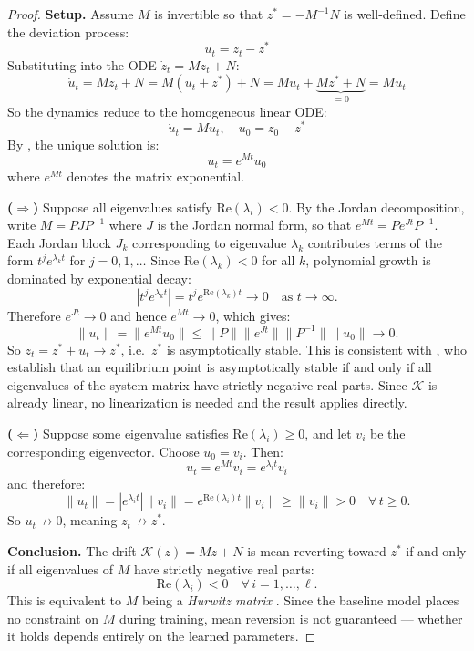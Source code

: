 \begin{proof}
\textbf{Setup.} Assume $M$ is invertible so that $z^* = -M^{-1}N$ is 
well-defined. Define the deviation process:
\[
u_t = z_t - z^*
\]
Substituting into the ODE $\dot{z}_t = Mz_t + N$:
\[
\dot{u}_t = Mz_t + N = M(u_t + z^*) + N = Mu_t + 
\underbrace{Mz^* + N}_{=0} = Mu_t
\]
So the dynamics reduce to the homogeneous linear ODE:
\[
\dot{u}_t = Mu_t, \quad u_0 = z_0 - z^*
\]
By \citet[][p.~129]{Hirsch2012}, the unique solution is:
\[
u_t = e^{Mt}u_0
\]
where $e^{Mt}$ denotes the matrix exponential.

\textbf{($\Rightarrow$)} Suppose all eigenvalues satisfy 
$\mathrm{Re}(\lambda_i) < 0$. By the Jordan decomposition, write 
$M = PJP^{-1}$ where $J$ is the Jordan normal form, so that 
$e^{Mt} = Pe^{Jt}P^{-1}$. Each Jordan block $J_k$ corresponding to 
eigenvalue $\lambda_k$ contributes terms of the form $t^j e^{\lambda_k t}$ 
for $j = 0, 1, \ldots$ Since $\mathrm{Re}(\lambda_k) < 0$ for all $k$, 
polynomial growth is dominated by exponential decay:
\[
|t^j e^{\lambda_k t}| = t^j e^{\mathrm{Re}(\lambda_k)t} \to 0 
\quad \text{as } t \to \infty.
\]
Therefore $e^{Jt} \to 0$ and hence $e^{Mt} \to 0$, which gives:
\[
\|u_t\| = \|e^{Mt}u_0\| \leq \|P\|\|e^{Jt}\|\|P^{-1}\|\|u_0\| \to 0.
\]
So $z_t = z^* + u_t \to z^*$, i.e.\ $z^*$ is asymptotically stable. This 
is consistent with \citet[][p.~175]{Hirsch2012}, who establish that an 
equilibrium point is asymptotically stable if and only if all eigenvalues 
of the system matrix have strictly negative real parts. Since 
$\mathcal{K}$ is already linear, no linearization is needed and the 
result applies directly.

\textbf{($\Leftarrow$)} Suppose some eigenvalue satisfies 
$\mathrm{Re}(\lambda_i) \geq 0$, and let $v_i$ be the corresponding 
eigenvector. Choose $u_0 = v_i$. Then:
\[
u_t = e^{Mt}v_i = e^{\lambda_i t}v_i
\]
and therefore:
\[
\|u_t\| = |e^{\lambda_i t}|\|v_i\| = 
e^{\mathrm{Re}(\lambda_i)t}\|v_i\| \geq \|v_i\| > 0 
\quad \forall\, t \geq 0.
\]
So $u_t \not\to 0$, meaning $z_t \not\to z^*$.

\textbf{Conclusion.} The drift $\mathcal{K}(z) = Mz + N$ is mean-reverting 
toward $z^*$ if and only if all eigenvalues of $M$ have strictly negative 
real parts:
\[
\mathrm{Re}(\lambda_i) < 0 \quad \forall\, i = 1, \ldots, \ell.
\]
This is equivalent to $M$ being a \emph{Hurwitz matrix} 
\citep[][p.~175]{Hirsch2012}. Since the baseline model places no 
constraint on $M$ during training, mean reversion is not guaranteed --- 
whether it holds depends entirely on the learned parameters.
\end{proof}



